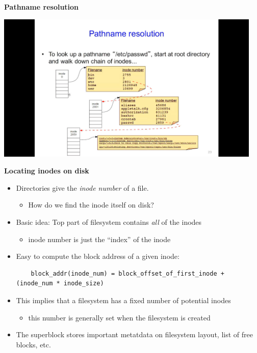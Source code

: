 \documentclass[11pt,a4paper]{article}
\begin{document}
\textbf{Pathname resolution}

\includegraphics[height=270]{pathname-resolution.jpg}

\textbf{Locating inodes on disk}
\begin{itemize}
    \item Directories give the \emph{inode number} of a file.
        \begin{itemize}
            \item How do we find the inode itself on disk?
        \end{itemize}
    \item Basic idea: Top part of filesystem contains \emph{all} of the inodes
        \begin{itemize}
            \item inode number is just the ``index'' of the inode
        \end{itemize}
    \item Easy to compute the block address of a given inode:
        \begin{verbatim}
    block_addr(inode_num) = block_offset_of_first_inode + (inode_num * inode_size)
        \end{verbatim}
    \item This implies that a filesystem has a fixed number of potential inodes
        \begin{itemize}
            \item this number is generally set when the filesystem is created
        \end{itemize}
    \item The superblock stores important metatdata on filesystem layout,
        list of free blocks, etc.
\end{itemize}
\end{document}
